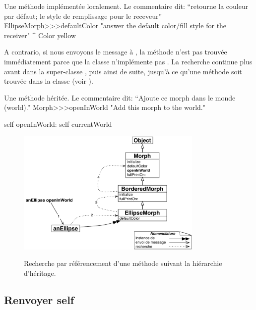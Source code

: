 \documentclass[a4paper,10pt,twoside]{book}
\begin{document}
\begin{method}[defaultColor]{Une méthode implémentée localement. Le commentaire dit: ``retourne la couleur par défaut; le style de remplissage pour le receveur''}
EllipseMorph>>>defaultColor
	"answer the default color/fill style for the receiver"
	^ Color yellow
\end{method}

A contrario, si nous envoyons le message  à \mbox{,} la méthode n'est pas trouvée immédiatement parce que la classe  n'implémente pas .
La recherche continue plus avant dans la super-classe \mbox{,} puis ainsi de suite, jusqu'à ce qu'une méthode  soit trouvée dans la classe  (voir ).

\begin{method}[openInWorld]{Une méthode héritée. Le commentaire dit: ``Ajoute ce morph dans le monde (world).''}
Morph>>>openInWorld
	"Add this morph to the world."

  self openInWorld: self currentWorld
\end{method}

\begin{figure}[htb]
\begin{center}
	{\includegraphics[width=0.8\textwidth]{openInWorldLookup}}
\caption{Recherche par référencement d'une méthode suivant la hiérarchie d'héritage.}
\end{center}
\end{figure}

\subsection{Renvoyer self}
\end{document}
